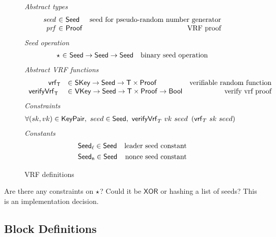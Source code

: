 \begin{figure}[htb]
  \emph{Abstract types}
  \begin{equation*}
    \begin{array}{r@{~\in~}lr}
      \var{seed} & \Seed  & \text{seed for pseudo-random number generator}\\
      \var{prf} & \Proof  & \text{VRF proof}\\
    \end{array}
  \end{equation*}
  \emph{Seed operation}
  \begin{equation*}
    \begin{array}{r@{~\in~}lr}
      \seedOp & \Seed \to \Seed \to \Seed & \text{binary seed operation}
    \end{array}
  \end{equation*}
  \emph{Abstract VRF functions}
  \begin{equation*}
    \begin{array}{r@{~\in~}lr}
      \vrf{\T}{}{} & \SKey \to \Seed \to \T\times\Proof
                   & \text{verifiable random function} \\
      \verifyVrf{\T}{}{}{} & \VKey \to \Seed \to \T\times\Proof \to \Bool
                           & \text{verify vrf proof} \\
    \end{array}
  \end{equation*}
  \emph{Constraints}
  \begin{align*}
    & \forall (sk, vk) \in \mathsf{KeyPair},~ seed \in \mathsf{Seed},~
    \mathsf{verifyVrf}_{T} ~ vk ~ seed ~\left(\mathsf{vrf}_{T} ~ sk ~ seed\right)
  \end{align*}
  \emph{Constants}
  \begin{align*}
    & \mathsf{Seed_\ell} \in \mathsf{Seed} & \text{leader seed constant} \\
    & \mathsf{Seed_n} \in \mathsf{Seed} & \text{nonce seed constant}\\
  \end{align*}

  \caption{VRF definitions}
  \label{fig:defs-vrf}
\end{figure}

\begin{todo}
  Are there any constraints on $\star$?
  Could it be $\mathsf{XOR}$ or hashing a list of seeds?
  This is an implementation decision.
\end{todo}
\clearpage

\subsection{Block Definitions}
\label{sec:defs-blocks}

